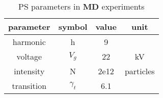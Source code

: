 \begin{table}
    \centering
    \begin{tabular}{c|c |c |c}
        parameter  & symbol     & value & unit      \\
        \hline
        harmonic   & h          & 9     &           \\
        voltage    & $V_g$      & 22    & kV        \\
        intensity  & N          & 2e12  & particles \\
        transition & $\gamma_t$ & 6.1   &           \\
    \end{tabular}
    \caption{PS parameters in \textbf{MD} experiments}
\end{table}